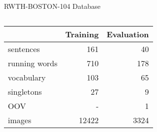 \documentclass[final]{beamer}
\begin{document}
\begin{frame}{}
\begin{columns}[t]
\begin{column}{.45\linewidth}
\begin{block}{RWTH-BOSTON-104 Database}
\begin{columns}[t]
\begin{column}{.5\linewidth}
\begin{itemize}
            \begin{tabular}{@{} l rr @{}}
              \toprule
              & Training   &  Evaluation \\
              \midrule
              sentences        & 161        &   40   \\
              running words    & 710        &  178   \\
              vocabulary       & 103        &   65   \\
              singletons       &  27        &    9   \\
              OOV              & -          &    1   \\
              images           & 12422      & 3324   \\
              \bottomrule
            \end{tabular}
          \end{itemize}
        \end{column}
        \begin{column}{.5\linewidth}
        \end{column}
      \end{columns}
    \end{block}
    
\end{column}
\end{columns}
\end{frame}
\end{document}
